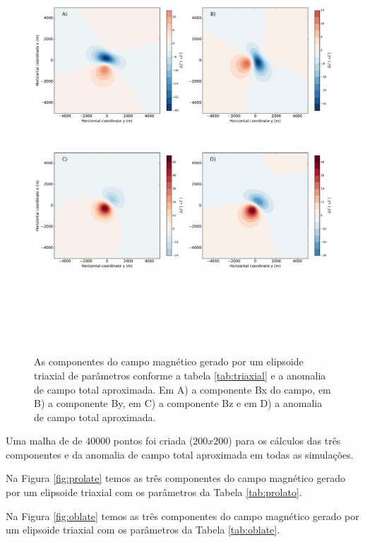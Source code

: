 \begin{figure}[hbt!]
	\centering \includegraphics[width=16cm,height=16cm]{figures/ellipsoid_triaxial}
	\caption[As componentes do campo magnético gerado por um elipsoide triaxial e a anomalia de campo total aproximada.]{As componentes 
		do campo magnético gerado por um elipsoide triaxial de parâmetros conforme a tabela \ref{tab:triaxial} e a anomalia de campo total aproximada. Em A) a componente Bx do campo, em B) a componente By, em C) a componente Bz e em D) a anomalia de campo total aproximada.}
	\label{fig:triaxial}
\end{figure}

Uma malha de de $40000$ pontos foi criada ($200x200$) para os cálculos das três componentes e da anomalia de campo total aproximada em todas as simulações.

Na Figura \ref{fig:prolate} temos as três componentes do campo magnético gerado por um elipsoide triaxial com os parâmetros da Tabela \ref{tab:prolato}.

Na Figura \ref{fig:oblate} temos as três componentes do campo magnético gerado por um elipsoide triaxial com os parâmetros da Tabela \ref{tab:oblate}.
\\\\\\

